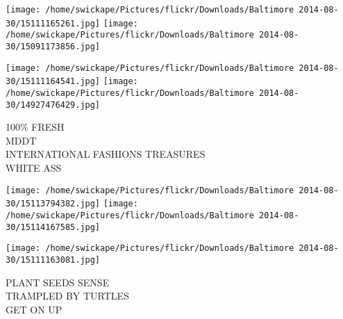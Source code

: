 \documentclass[10pt,letterpaper]{article}
\begin{document}
\texttt{[image: /home/swickape/Pictures/flickr/Downloads/Baltimore 2014-08-30/15111165261.jpg]}
\texttt{[image: /home/swickape/Pictures/flickr/Downloads/Baltimore 2014-08-30/15091173856.jpg]}

\texttt{[image: /home/swickape/Pictures/flickr/Downloads/Baltimore 2014-08-30/15111164541.jpg]}
\texttt{[image: /home/swickape/Pictures/flickr/Downloads/Baltimore 2014-08-30/14927476429.jpg]}

100\% FRESH\\
MDDT\\
INTERNATIONAL FASHIONS TREASURES\\
WHITE ASS
\pagebreak

\texttt{[image: /home/swickape/Pictures/flickr/Downloads/Baltimore 2014-08-30/15113794382.jpg]}
\texttt{[image: /home/swickape/Pictures/flickr/Downloads/Baltimore 2014-08-30/15114167585.jpg]}

\texttt{[image: /home/swickape/Pictures/flickr/Downloads/Baltimore 2014-08-30/15111163081.jpg]}

PLANT SEEDS SENSE\\
TRAMPLED BY TURTLES\\
GET ON UP
\pagebreak
\end{document}
